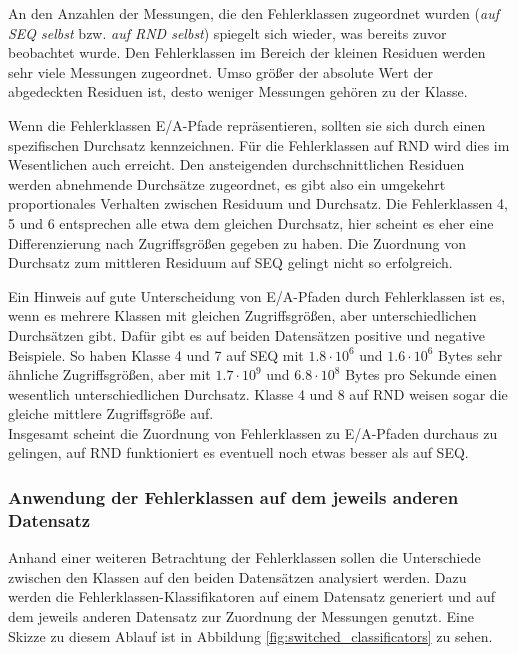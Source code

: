 \documentclass[
	twoside,
	12pt,
	a4paper,
	BCOR10mm,
	DIV14,
	listof=totoc,
	bibliography=totoc,
	headsepline
]{scrreprt}
\begin{document}
An den Anzahlen der Messungen, die den Fehlerklassen zugeordnet wurden (\textit{auf SEQ selbst} bzw. \textit{auf RND selbst}) spiegelt sich wieder, was bereits zuvor beobachtet wurde.
Den Fehlerklassen im Bereich der kleinen Residuen werden sehr viele Messungen zugeordnet. Umso größer der absolute Wert der abgedeckten Residuen ist, desto weniger Messungen gehören zu der Klasse.\medskip

Wenn die Fehlerklassen E/A-Pfade repräsentieren, sollten sie sich durch einen spezifischen Durchsatz kennzeichnen.
Für die Fehlerklassen auf RND wird dies im Wesentlichen auch erreicht.
Den ansteigenden durchschnittlichen Residuen werden abnehmende Durchsätze zugeordnet, es gibt also ein umgekehrt proportionales Verhalten zwischen Residuum und Durchsatz.
Die Fehlerklassen 4, 5 und 6 entsprechen alle etwa dem gleichen Durchsatz, hier scheint es eher eine Differenzierung nach Zugriffsgrößen gegeben zu haben.
Die Zuordnung von Durchsatz zum mittleren Residuum auf SEQ gelingt nicht so erfolgreich.\medskip

Ein Hinweis auf gute Unterscheidung von E/A-Pfaden durch Fehlerklassen ist es, wenn es mehrere Klassen mit gleichen Zugriffsgrößen, aber unterschiedlichen Durchsätzen gibt.
Dafür gibt es auf beiden Datensätzen positive und negative Beispiele.
So haben Klasse 4 und 7 auf SEQ mit $1.8\cdot 10^6$ und $1.6\cdot 10^6$ Bytes sehr ähnliche Zugriffsgrößen, aber mit $1.7\cdot 10^9$ und $6.8\cdot 10^8$ Bytes pro Sekunde einen wesentlich unterschiedlichen Durchsatz.
Klasse 4 und 8 auf RND weisen sogar die gleiche mittlere Zugriffsgröße auf.\\
Insgesamt scheint die Zuordnung von Fehlerklassen zu E/A-Pfaden durchaus zu gelingen, auf RND funktioniert es eventuell noch etwas besser als auf SEQ.

\subsubsection{Anwendung der Fehlerklassen auf dem jeweils anderen Datensatz}
Anhand einer weiteren Betrachtung der Fehlerklassen sollen die Unterschiede zwischen den Klassen auf den beiden Datensätzen analysiert werden.
Dazu werden die Fehlerklassen-Klassifikatoren auf einem Datensatz generiert und auf dem jeweils anderen Datensatz zur Zuordnung der Messungen genutzt.
Eine Skizze zu diesem Ablauf ist in Abbildung \ref{fig:switched_classificators} zu sehen.
\end{document}
